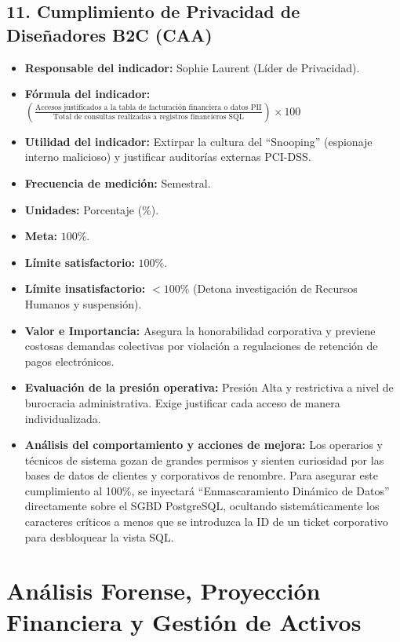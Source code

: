 \documentclass[11pt,a4paper]{article}
\begin{document}
\subsection{11. Cumplimiento de Privacidad de Diseñadores B2C (CAA)}
\begin{itemize}[label={--}, itemsep=0.1cm]
    \item \textbf{Responsable del indicador:} Sophie Laurent (Líder de Privacidad).
    \item \textbf{Fórmula del indicador:} $\left(\frac{\text{Accesos justificados a la tabla de facturación financiera o datos PII}}{\text{Total de consultas realizadas a registros financieros SQL}}\right) \times 100$
    \item \textbf{Utilidad del indicador:} Extirpar la cultura del \enquote{Snooping} (espionaje interno malicioso) y justificar auditorías externas PCI-DSS.
    \item \textbf{Frecuencia de medición:} Semestral.
    \item \textbf{Unidades:} Porcentaje (\%).
    \item \textbf{Meta:} $100\%$.
    \item \textbf{Límite satisfactorio:} $100\%$.
    \item \textbf{Límite insatisfactorio:} $< 100\%$ (Detona investigación de Recursos Humanos y suspensión).
    \item \textbf{Valor e Importancia:} Asegura la honorabilidad corporativa y previene costosas demandas colectivas por violación a regulaciones de retención de pagos electrónicos.
    \item \textbf{Evaluación de la presión operativa:} Presión Alta y restrictiva a nivel de burocracia administrativa. Exige justificar cada acceso de manera individualizada.
    \item \textbf{Análisis del comportamiento y acciones de mejora:} Los operarios y técnicos de sistema gozan de grandes permisos y sienten curiosidad por las bases de datos de clientes y corporativos de renombre. Para asegurar este cumplimiento al 100\%, se inyectará \enquote{Enmascaramiento Dinámico de Datos} directamente sobre el SGBD PostgreSQL, ocultando sistemáticamente los caracteres críticos a menos que se introduzca la ID de un ticket corporativo para desbloquear la vista SQL.
\end{itemize}

\section{Análisis Forense, Proyección Financiera y Gestión de Activos}
\end{document}
